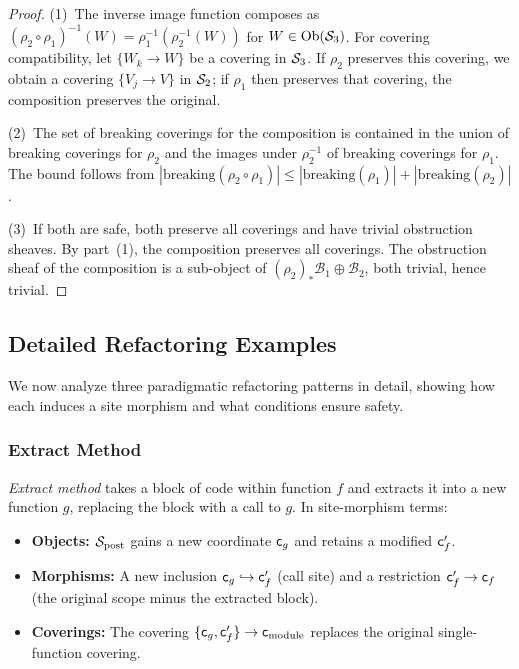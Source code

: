\documentclass[11pt]{article}
\newcommand{\SitePost}{\Site_{\mathrm{post}}}
\newcommand{\RefactorMorph}{\rho}
\newcommand{\ObstructionSheaf}{\mathcal{B}}
\begin{document}
\begin{proof}
(1)~The inverse image function composes as
$(\RefactorMorph_2 \circ \RefactorMorph_1)^{-1}(W) =
\RefactorMorph_1^{-1}(\RefactorMorph_2^{-1}(W))$ for
$W \in \mathrm{Ob}(\mathcal{S}_3)$.  For covering compatibility, let
$\{W_k \to W\}$ be a covering in $\mathcal{S}_3$.  If
$\RefactorMorph_2$ preserves this covering, we obtain a covering
$\{V_j \to V\}$ in $\mathcal{S}_2$; if $\RefactorMorph_1$ then preserves
that covering, the composition preserves the original.

(2)~The set of breaking coverings for the composition is contained in
the union of breaking coverings for $\RefactorMorph_2$ and the images
under $\RefactorMorph_2^{-1}$ of breaking coverings for
$\RefactorMorph_1$.  The bound follows from
$|\mathrm{breaking}(\RefactorMorph_2 \circ \RefactorMorph_1)| \leq
|\mathrm{breaking}(\RefactorMorph_1)| +
|\mathrm{breaking}(\RefactorMorph_2)|$.

(3)~If both are safe, both preserve all coverings and have trivial
obstruction sheaves.  By part~(1), the composition preserves all
coverings.  The obstruction sheaf of the composition is a sub-object of
$(\RefactorMorph_2)_*\ObstructionSheaf_1 \oplus
\ObstructionSheaf_2$, both trivial, hence trivial.
\end{proof}

\subsection{Detailed Refactoring Examples}\label{ssec:refactor-examples}

We now analyze three paradigmatic refactoring patterns in detail,
showing how each induces a site morphism and what conditions ensure
safety.

\subsubsection{Extract Method}\label{sssec:extract-method}

\emph{Extract method} takes a block of code within function $f$ and
extracts it into a new function $g$, replacing the block with a call to
$g$.  In site-morphism terms:

\begin{itemize}[noitemsep]
  \item \textbf{Objects:} $\SitePost$ gains a new coordinate
        $\mathsf{c}_g$ and retains a modified $\mathsf{c}_f'$.
  \item \textbf{Morphisms:} A new inclusion
        $\mathsf{c}_g \hookrightarrow \mathsf{c}_f'$ (call site) and a
        restriction $\mathsf{c}_f' \to \mathsf{c}_f$ (the original scope minus
        the extracted block).
  \item \textbf{Coverings:} The covering
        $\{\mathsf{c}_g, \mathsf{c}_f'\} \to \mathsf{c}_{\mathrm{module}}$
        replaces the original single-function covering.
\end{itemize}
\end{document}
